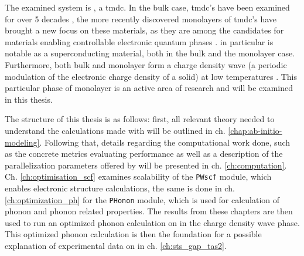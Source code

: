 \documentclass[main.tex]{subfiles}
\begin{document}
The examined system is \TaS, a \acrfull{tmdc}.
In the bulk case, \acrshort{tmdc}'s have been examined for over 5 decades \cite{wilson_transition_1969}, the more recently discovered monolayers of \acrshort{tmdc}'s \cite{novoselov_two-dimensional_2005} have brought a new focus on these materials, as they are among the candidates for materials enabling controllable electronic quantum phases \cite{basov_towards_2017}.
\TaS in particular is notable as a superconducting material, both in the bulk and the monolayer case.
Furthermore, both bulk and monolayer \TaS form a charge density wave (a periodic modulation of the electronic charge density of a solid) at low temperatures \cite{hall_environmental_2019}.
This particular phase of monolayer \TaS is an active area of research and will be examined in this thesis.

The structure of this thesis is as follows:
first, all relevant theory needed to understand the calculations made with \QE will be outlined in ch. \ref{chap:ab-initio-modeling}.
Following that, details regarding the computational work done, such as the concrete metrics evaluating performance as well as a description of the parallelization parameters offered by \QE will be presented in ch. \ref{ch:computation}.
Ch. \ref{ch:optimisation_scf} examines scalability of the \texttt{PWscf} module, which enables electronic structure calculations, the same is done in ch. \ref{ch:optimization_ph} for the \texttt{PHonon} module, which is used for calculation of phonon and phonon related properties. 
The results from these chapters are then used to run an optimized phonon calculation on \TaS in the charge density wave phase.
This optimized phonon calculation is then the foundation for a possible explanation of experimental data on \TaS in ch. \ref{ch:sts_gap_tas2}.
\end{document}
